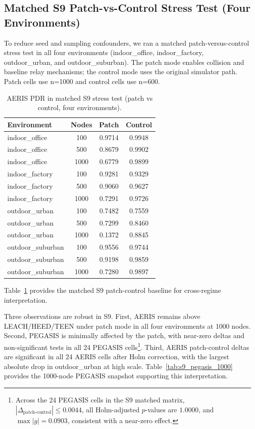 ﻿\documentclass[sensors,article,submit,moreauthors,pdftex]{Definitions/mdpi}
\begin{document}
\subsection{Matched S9 Patch-vs-Control Stress Test (Four Environments)}
To reduce seed and sampling confounders, we ran a matched patch-versus-control stress test in all four environments (indoor\_office, indoor\_factory, outdoor\_urban, and outdoor\_suburban). The patch mode enables collision and baseline relay mechanisms; the control mode uses the original simulator path. Patch cells use n=1000 and control cells use n=600.

\begin{table}[H]
\caption{AERIS PDR in matched S9 stress test (patch vs control, four environments).}
\label{tab:s9_patch_control}
\centering
\begin{tabular}{lccc}
\toprule
Environment & Nodes & Patch & Control \\
\midrule
indoor\_office & 100  & 0.9714 & 0.9948 \\
indoor\_office & 500  & 0.8679 & 0.9902 \\
indoor\_office & 1000 & 0.6779 & 0.9899 \\
indoor\_factory & 100  & 0.9281 & 0.9329 \\
indoor\_factory & 500  & 0.9060 & 0.9627 \\
indoor\_factory & 1000 & 0.7291 & 0.9726 \\
outdoor\_urban & 100  & 0.7482 & 0.7559 \\
outdoor\_urban & 500  & 0.7299 & 0.8460 \\
outdoor\_urban & 1000 & 0.1372 & 0.8845 \\
outdoor\_suburban & 100  & 0.9556 & 0.9744 \\
outdoor\_suburban & 500  & 0.9198 & 0.9859 \\
outdoor\_suburban & 1000 & 0.7280 & 0.9897 \\
\bottomrule
\end{tabular}
\end{table}

Table~\ref{tab:s9_patch_control} provides the matched S9 patch-control baseline for cross-regime interpretation.

Three observations are robust in S9. First, AERIS remains above LEACH/HEED/TEEN under patch mode in all four environments at 1000 nodes. Second, PEGASIS is minimally affected by the patch, with near-zero deltas and non-significant tests in all 24 PEGASIS cells\footnote{Across the 24 PEGASIS cells in the S9 matched matrix, \(|\Delta_{\text{patch-control}}| \le 0.0044\), all Holm-adjusted \(p\)-values are \(1.0000\), and \(\max |g| = 0.0903\), consistent with a near-zero effect.}. Third, AERIS patch-control deltas are significant in all 24 AERIS cells after Holm correction, with the largest absolute drop in outdoor\_urban at high scale. Table~\ref{tab:s9_pegasis_1000} provides the 1000-node PEGASIS snapshot supporting this interpretation.
\end{document}
